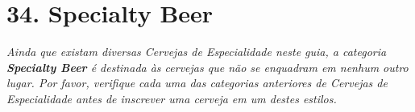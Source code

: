 \section*{34. Specialty Beer}

\textit{Ainda que existam diversas Cervejas de Especialidade neste guia, a categoria \textbf{Specialty Beer} é destinada às cervejas que não se enquadram em nenhum outro lugar. Por favor, verifique cada uma das categorias anteriores de Cervejas de Especialidade antes de inscrever uma cerveja em um destes estilos.}
